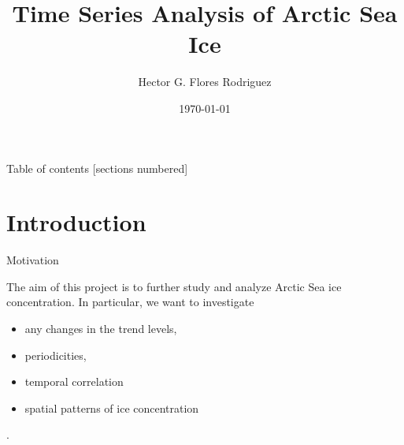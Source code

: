 \documentclass[10pt]{beamer}
\title{Time Series Analysis of Arctic Sea Ice}
\date{\today}
\author{Hector G. Flores Rodriguez}
\institute{KAUST Biostatistics}
\begin{document}
\maketitle


\begin{frame}{Table of contents}
  [sections numbered]
  \tableofcontents[hideallsubsections]
\end{frame}
  
  
  
\section{Introduction}
\begin{frame}{Motivation}

The aim of this project is to further study and analyze Arctic Sea ice concentration. In particular, we want to investigate 

\begin{itemize}
\item any changes in the trend levels,
\item periodicities,
\item temporal correlation
\item spatial patterns of ice concentration
\end{itemize}
.
\end{frame}
\end{document}
